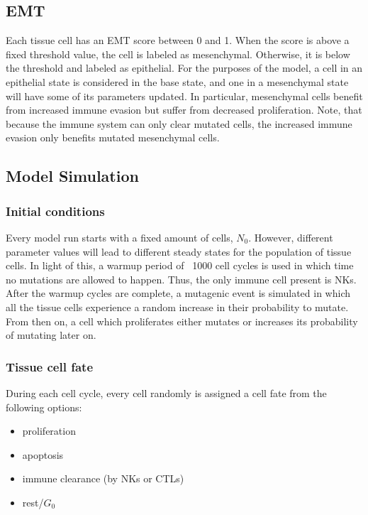 \documentclass{article}
\begin{document}
\subsection{EMT}\label{EMT}
Each tissue cell has an EMT score between 0 and 1.
When the score is above a fixed threshold value, the cell is labeled as mesenchymal.
Otherwise, it is below the threshold and labeled as epithelial.
For the purposes of the model, a cell in an epithelial state is considered in the base state, and one in a mesenchymal state will have some of its parameters updated.
In particular, mesenchymal cells benefit from increased immune evasion but suffer from decreased proliferation.
Note, that because the immune system can only clear mutated cells, the increased immune evasion only benefits mutated mesenchymal cells.

\subsection{Model Simulation}

\subsubsection{Initial conditions} Every model run starts with a fixed amount of cells, $N_0$.
However, different parameter values will lead to different steady states for the population of tissue cells.
In light of this, a warmup period of ~1000 cell cycles is used in which time no mutations are allowed to happen.
Thus, the only immune cell present is NKs.
After the warmup cycles are complete, a mutagenic event is simulated in which all the tissue cells experience a random increase in their probability to mutate.
From then on, a cell which proliferates either mutates or increases its probability of mutating later on.

\subsubsection{Tissue cell fate}
During each cell cycle, every cell randomly is assigned a cell fate from the following options:
\begin{itemize}
\item proliferation
\item apoptosis
\item immune clearance (by NKs or CTLs)
\item rest/$G_0$ %
\end{itemize}
\end{document}
